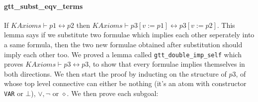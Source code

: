 \documentclass[submission,copyright,creativecommons]{eptcs}
\begin{document}
\paragraph{gtt\_subst\_eqv\_terms} If $KAxioms \vdash p1 \leftrightarrow p2$ 
then $KAxioms \vdash p3[v:=p1] \leftrightarrow p3[v:=p2]$. This 
lemma says if we substitute two formulae which implies each other seperately 
into a same formula, then the two new formulae obtained after substitution 
should imply each other too. We proved a lemma called \texttt{gtt\_double\_imp\_self} 
which proves $KAxioms \vdash p3 \leftrightarrow p3$, to show that 
every formulae implies themselves in both directions. We then start the 
proof by inducting on the structure of $p3$, of whose top level 
connective can either be nothing (it's an atom with constructor \texttt{VAR}
or $\bot$), $\vee, \neg$ or $\diamond$. We then prove each subgoal:
\end{document}
